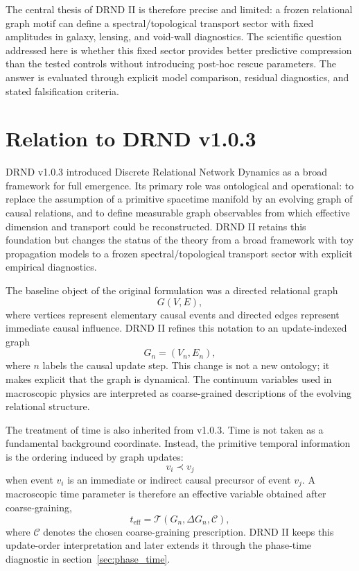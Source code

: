 \documentclass[12pt]{iopart}
\begin{document}
The central thesis of DRND II is therefore precise and limited: a frozen relational graph motif can define a spectral/topological transport sector with fixed amplitudes in galaxy, lensing, and void-wall diagnostics. The scientific question addressed here is whether this fixed sector provides better predictive compression than the tested controls without introducing post-hoc rescue parameters. The answer is evaluated through explicit model comparison, residual diagnostics, and stated falsification criteria.

\section{Relation to DRND v1.0.3}
\label{sec:relation_v103}

DRND v1.0.3 introduced Discrete Relational Network Dynamics as a broad framework for full emergence. Its primary role was ontological and operational: to replace the assumption of a primitive spacetime manifold by an evolving graph of causal relations, and to define measurable graph observables from which effective dimension and transport could be reconstructed. DRND II retains this foundation but changes the status of the theory from a broad framework with toy propagation models to a frozen spectral/topological transport sector with explicit empirical diagnostics.

The baseline object of the original formulation was a directed relational graph
\begin{equation}
G(V,E),
\end{equation}
where vertices represent elementary causal events and directed edges represent immediate causal influence. DRND II refines this notation to an update-indexed graph
\begin{equation}
G_n=(V_n,E_n),
\end{equation}
where \(n\) labels the causal update step. This change is not a new ontology; it makes explicit that the graph is dynamical. The continuum variables used in macroscopic physics are interpreted as coarse-grained descriptions of the evolving relational structure.

The treatment of time is also inherited from v1.0.3. Time is not taken as a fundamental background coordinate. Instead, the primitive temporal information is the ordering induced by graph updates:
\begin{equation}
v_i\prec v_j
\end{equation}
when event \(v_i\) is an immediate or indirect causal precursor of event \(v_j\). A macroscopic time parameter is therefore an effective variable obtained after coarse-graining,
\begin{equation}
t_{\mathrm{eff}}
=
\mathcal{T}(G_n,\Delta G_n,\mathcal{C}),
\end{equation}
where \(\mathcal{C}\) denotes the chosen coarse-graining prescription. DRND II keeps this update-order interpretation and later extends it through the phase-time diagnostic in section~\ref{sec:phase_time}.
\end{document}
